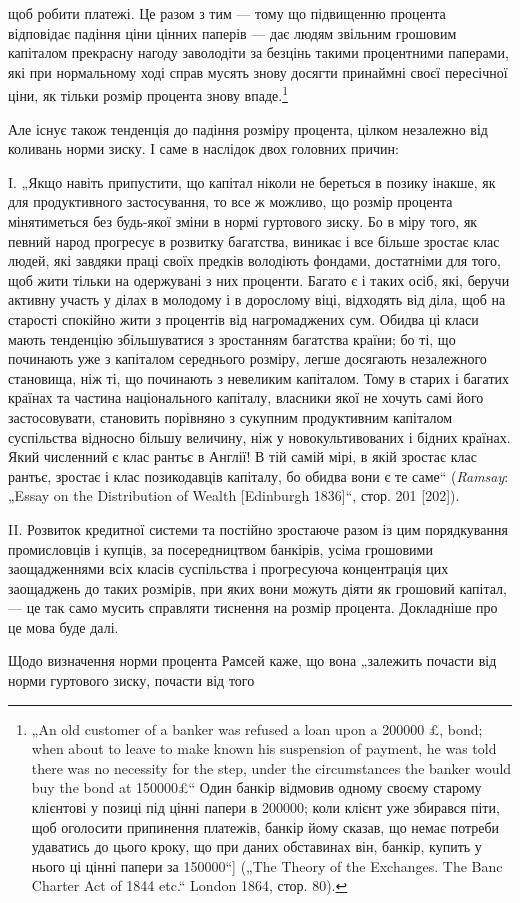 \parcont{}  %
щоб робити платежі. Це разом з тим — тому що підвищенню процента
відповідає падіння ціни цінних паперів — дає людям звільним
грошовим капіталом прекрасну нагоду заволодіти за безцінь
такими процентними паперами, які при нормальному ході справ
мусять знову досягти принаймні своєї пересічної ціни, як тільки
розмір процента знову впаде.\footnote{
„An old customer of a banker was refused a loan upon a \num{200000} £, bond;
when about to leave to make known his suspension of payment, he was told
there was no necessity for the step, under the circumstances the banker would buy
the bond at \num{150000}£“ Один банкір відмовив одному своєму старому клієнтові
у позиці під цінні папери в \num{200000}; коли клієнт уже збирався
піти, щоб оголосити припинення платежів, банкір йому сказав, що немає потреби
удаватись до цього кроку, що при даних обставинах він, банкір, купить
у нього ці цінні папери за \num{150000}“] („The Theory of the Exchanges.
The Banc Charter Act of 1844 etc.“ London 1864, стор. 80).
}

Але існує також тенденція до падіння розміру процента, цілком
незалежно від коливань норми зиску. І саме в наслідок
двох головних причин:

I. „Якщо навіть припустити, що капітал ніколи не береться
в позику інакше, як для продуктивного застосування, то все ж
можливо, що розмір процента мінятиметься без будь-якої зміни
в нормі гуртового зиску. Бо в міру того, як певний народ прогресує
в розвитку багатства, виникає і все більше зростає клас
людей, які завдяки праці своїх предків володіють фондами, достатніми
для того, щоб жити тільки на одержувані з них проценти.
Багато є і таких осіб, які, беручи активну участь у ділах в молодому
і в дорослому віці, відходять від діла, щоб на старості
спокійно жити з процентів від нагромаджених сум. Обидва ці
класи мають тенденцію збільшуватися з зростанням багатства
країни; бо ті, що починають уже з капіталом середнього розміру,
легше досягають незалежного становища, ніж ті, що починають
з невеликим капіталом. Тому в старих і багатих країнах
та частина національного капіталу, власники якої не хочуть самі
його застосовувати, становить порівняно з сукупним продуктивним
капіталом суспільства відносно більшу величину, ніж
у новокультивованих і бідних країнах. Який численний є клас
рантьє в Англії! В тій самій мірі, в якій зростає клас рантьє,
зростає і клас позикодавців капіталу, бо обидва вони є те саме“
(\emph{Ramsay}: „Essay on the Distribution of Wealth [Edinburgh 1836]“,
стор. 201 [202]).

II. Розвиток кредитної системи та постійно зростаюче разом
із цим порядкування промисловців і купців, за посередництвом
банкірів, усіма грошовими заощадженнями всіх класів суспільства
і прогресуюча концентрація цих заощаджень до таких розмірів,
при яких вони можуть діяти як грошовий капітал, — це
так само мусить справляти тиснення на розмір процента.
Докладніше про це мова буде далі.

Щодо визначення норми процента Рамсей каже, що вона „залежить
почасти від норми гуртового зиску, почасти від того
\parbreak{}  %
